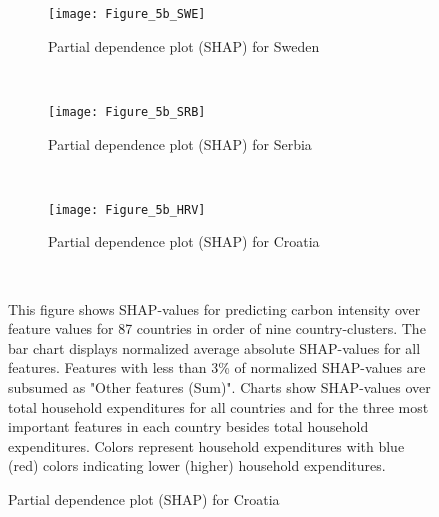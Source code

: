 \begin{figure}[ht!]\ContinuedFloat
    \centering
   \begin{subfigure}[b]{\textwidth}
         \centering
         \caption{Partial dependence plot (SHAP) for Sweden}
         \label{fig:5b_SWE}
         \texttt{[image: Figure\_5b\_SWE]}         
     \end{subfigure}
    \\
    \vspace{0.5cm}
   \begin{subfigure}[b]{\textwidth}
         \centering
         \caption{Partial dependence plot (SHAP) for Serbia}
         \label{fig:5b_SRB}
         \texttt{[image: Figure\_5b\_SRB]}         
     \end{subfigure}
    \\
    \vspace{0.5cm}
   \begin{subfigure}[b]{\textwidth}
         \centering
         \caption{Partial dependence plot (SHAP) for Croatia}
         \label{fig:5b_HRV}
         \texttt{[image: Figure\_5b\_HRV]}
    \end{subfigure}
    \\
    \vspace{0.5cm}
    \begin{subcaption2}
     This figure shows SHAP-values for predicting carbon intensity over feature values for 87 countries in order of nine country-clusters. The bar chart displays normalized average absolute SHAP-values for all features. Features with less than 3\% of normalized SHAP-values are subsumed as "Other features (Sum)". Charts show SHAP-values over total household expenditures for all countries and for the three most important features in each country besides total household expenditures. Colors represent household expenditures with blue (red) colors indicating lower (higher) household expenditures.
     \end{subcaption2}
\end{figure}


